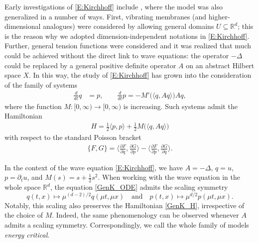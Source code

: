 \documentclass{amsart}
\newcommand{\R}{{\mathbb{R}}}
\newcommand{\qtq}[1]{\quad\text{#1}\quad}
\theoremstyle{definition}
\numberwithin{equation}{section}
\begin{document}
Early investigations of \eqref{E:Kirchhoff} include \cite{Bernstein,Dickey,Lions,Pohozaev75}, where the model was also generalized in a number of ways.  First, vibrating membranes (and higher-dimensional analogues) were considered by allowing general domains $U\subseteq\R^d$; this is the reason why we adopted dimension-independent notations in \eqref{E:Kirchhoff}.  Further, general tension functions were considered and it was realized that much could be achieved without the direct link to wave equations: the operator $-\Delta$ could be replaced by a general positive definite operator $A$ on an abstract Hilbert space $X$.  In this way, the study of \eqref{E:Kirchhoff} has grown into the consideration of the family of systems
\begin{align}\label{GenK_ODE}
\tfrac{d}{dt}q  &= p, \qquad \tfrac{d}{dt}p = - M'\bigl(\langle q,A q\rangle\bigr) A q ,
\end{align}
where the function $M:[0,\infty)\to [0,\infty)$ is increasing.  Such systems admit the Hamiltonian
\begin{align}\label{GenK_H}
H = \tfrac12 \langle p, p\rangle + \tfrac12 M\bigl(\langle q,A q\rangle\bigr)
\end{align}
with respect to the standard Poisson bracket
\begin{align}\label{Poisson}
\{F, G\} = \bigl\langle \tfrac{\partial F}{\partial q},\tfrac{\partial G}{\partial p} \bigr\rangle -\bigl\langle \tfrac{\partial F}{\partial p},\tfrac{\partial G}{\partial q} \bigr\rangle.
\end{align}

In the context of the wave equation \eqref{E:Kirchhoff}, we have $A=-\Delta$, $q=u$, $p=\partial_t u$, and $M(s) =s+\frac12 s^2$. When working with the wave equation in the whole space $\R^d$, the equation \eqref{GenK_ODE} admits the scaling symmetry
\begin{equation}\label{scaling}
q(t,x)\mapsto\mu^{(d-2)/2}q(\mu t,\mu x) \qtq{and} p(t,x)\mapsto\mu^{d/2}p(\mu t,\mu x).
\end{equation}
Notably, this scaling also preserves the Hamiltonian \eqref{GenK_H}, irrespective of the choice of $M$.  Indeed, the same phenomenology can be observed whenever $A$ admits a scaling symmetry. Correspondingly, we call the whole family of models \emph{energy critical}.
\end{document}
